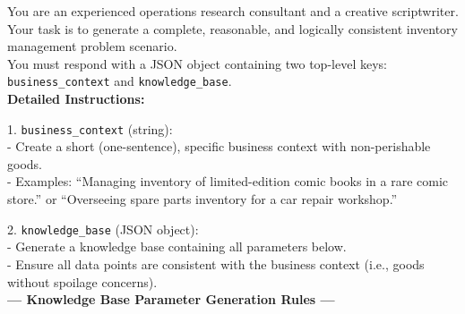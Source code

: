 \begin{table}[h]
    \begin{tcolorbox}
    \scriptsize
    You are an experienced operations research consultant and a creative scriptwriter.
    Your task is to generate a complete, reasonable, and logically consistent inventory management problem scenario.\\[0pt]

    You must respond with a JSON object containing two top-level keys: \texttt{business\_context} and \texttt{knowledge\_base}.\\[0pt]

    \textbf{Detailed Instructions:}

    1. \texttt{business\_context} (string): \\
    \hspace*{1em} - Create a short (one-sentence), specific business context with non-perishable goods. \\
    \hspace*{1em} - Examples: ``Managing inventory of limited-edition comic books in a rare comic store.'' or ``Overseeing spare parts inventory for a car repair workshop.''

    2. \texttt{knowledge\_base} (JSON object): \\
    \hspace*{1em} - Generate a knowledge base containing all parameters below. \\
    \hspace*{1em} - Ensure all data points are consistent with the business context (i.e., goods without spoilage concerns).\\[0pt]

    \textbf{--- Knowledge Base Parameter Generation Rules ---}


\end{tcolorbox}
\end{table}
